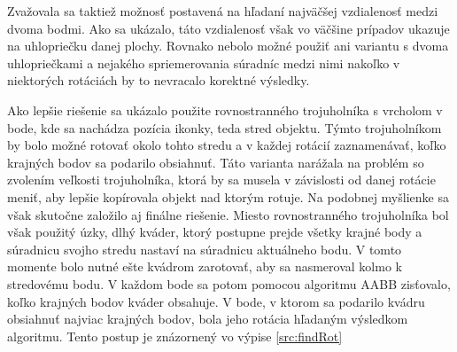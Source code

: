 \documentclass[slovak, bachelorpractice]{diploma}
\begin{document}
Zvažovala sa taktiež možnosť postavená na hľadaní najväčšej vzdialenosť medzi dvoma bodmi. Ako sa ukázalo, táto vzdialenosť však vo väčšine prípadov ukazuje na uhlopriečku danej plochy. Rovnako nebolo možné použiť ani variantu s dvoma uhlopriečkami a nejakého spriemerovania súradníc medzi nimi nakoľko v niektorých rotáciách by to nevracalo korektné výsledky. 

Ako lepšie riešenie sa ukázalo použite rovnostranného trojuholníka s vrcholom v bode, kde sa nachádza pozícia ikonky, teda stred objektu. Týmto trojuholníkom by bolo možné rotovať okolo tohto stredu a v každej rotácií zaznamenávať, koľko krajných bodov sa podarilo obsiahnuť. Táto varianta narážala na problém so zvolením veľkosti trojuholníka, ktorá by sa musela v závislosti od danej rotácie meniť, aby lepšie kopírovala objekt nad ktorým rotuje. Na podobnej myšlienke sa však skutočne založilo aj finálne riešenie. Miesto rovnostranného trojuholníka bol však použitý úzky, dlhý kváder, ktorý postupne prejde všetky krajné body a súradnicu svojho stredu nastaví na súradnicu aktuálneho bodu. V tomto momente bolo nutné ešte kvádrom zarotovať, aby sa nasmeroval kolmo k stredovému bodu. V každom bode sa potom pomocou algoritmu AABB zisťovalo, koľko krajných bodov kváder obsahuje. V bode, v ktorom sa podarilo kvádru obsiahnuť najviac krajných bodov, bola jeho rotácia hľadaným výsledkom algoritmu. Tento postup je znázornený vo výpise \ref{src:findRot}
\end{document}
